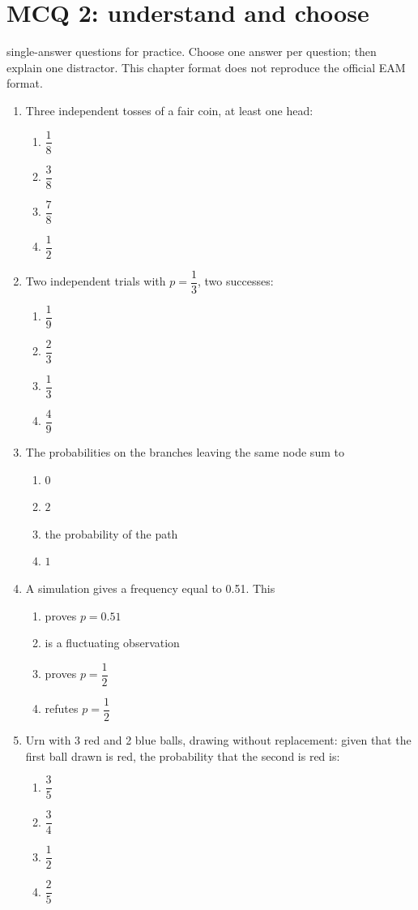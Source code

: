 \endgroup
\begingroup\small
{}\section*{MCQ 2: understand and choose}\label{C05-Q2}
 single-answer questions for practice. Choose one answer per question; then explain one distractor. This chapter format does not reproduce the official EAM format.
\begin{enumerate}
\item Three independent tosses of a fair coin, at least one head:
\begin{enumerate}[label=\Alph*.,itemsep=2pt]
\item $\dfrac{1}{8}$
\item $\dfrac{3}{8}$
\item $\dfrac{7}{8}$
\item $\dfrac{1}{2}$
\end{enumerate}
\item Two independent trials with $p=\dfrac{1}{3}$, two successes:
\begin{enumerate}[label=\Alph*.,itemsep=2pt]
\item $\dfrac{1}{9}$
\item $\dfrac{2}{3}$
\item $\dfrac{1}{3}$
\item $\dfrac{4}{9}$
\end{enumerate}
\item The probabilities on the branches leaving the same node sum to
\begin{enumerate}[label=\Alph*.,itemsep=2pt]
\item $0$
\item $2$
\item the probability of the path
\item $1$
\end{enumerate}
\item A simulation gives a frequency equal to \num{0,51}. This
\begin{enumerate}[label=\Alph*.,itemsep=2pt]
\item proves $p=\num{0,51}$
\item is a fluctuating observation
\item proves $p=\dfrac{1}{2}$
\item refutes $p=\dfrac{1}{2}$
\end{enumerate}
\item Urn with 3 red and 2 blue balls, drawing without replacement: given that the first ball drawn is red, the probability that the second is red is:
\begin{enumerate}[label=\Alph*.,itemsep=2pt]
\item $\dfrac{3}{5}$
\item $\dfrac{3}{4}$
\item $\dfrac{1}{2}$
\item $\dfrac{2}{5}$
\end{enumerate}
\end{enumerate}
